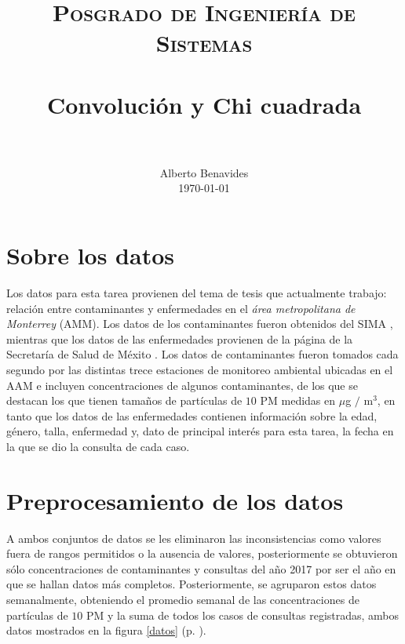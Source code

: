 \documentclass[paper=leter, fontsize=11pt]{scrartcl}
\title{
		\usefont{OT1}{bch}{b}{n}
		\normalfont \normalsize \textsc{Posgrado de Ingeniería de Sistemas} \\ [25pt]
		\horrule{0.5pt} \\[0.4cm]
		\huge Convolución y Chi cuadrada \\
		\horrule{2pt} \\[0.5cm]
}
\author{
		\normalfont 								\normalsize
        Alberto Benavides\\[-3pt]		\normalsize
        \today
}
\date{}
\begin{document}
 
\maketitle

\section{Sobre los datos}
Los datos para esta tarea provienen del tema de tesis que actualmente trabajo: relación entre contaminantes y enfermedades en el \emph{área metropolitana de Monterrey} (AMM). Los datos de los contaminantes fueron obtenidos del SIMA \citep{aireNL}, mientras que los datos de las enfermedades provienen de la página de la Secretaría de Salud de Méxito \citep{egresos}. Los datos de contaminantes fueron tomados cada segundo por las distintas trece estaciones de monitoreo ambiental ubicadas en el AAM e incluyen concentraciones de algunos contaminantes, de los que se destacan los que tienen tamaños de partículas de $10$ PM medidas en $\mu$g $/$ m$^3$, en tanto que los datos de las enfermedades contienen información sobre la edad, género, talla, enfermedad y, dato de principal interés para esta tarea, la fecha en la que se dio la consulta de cada caso.

\section{Preprocesamiento de los datos}
A ambos conjuntos de datos se les eliminaron las inconsistencias como valores fuera de rangos permitidos o la ausencia de valores, posteriormente se obtuvieron sólo concentraciones de contaminantes y consultas del año 2017 por ser el año en que se hallan datos más completos. Posteriormente, se agruparon estos datos semanalmente, obteniendo el promedio semanal de las concentraciones de partículas de $10$ PM y la suma de todos los casos de consultas registradas, ambos datos mostrados en la figura \ref{datos} (p. \pageref{datos}).
\end{document}

